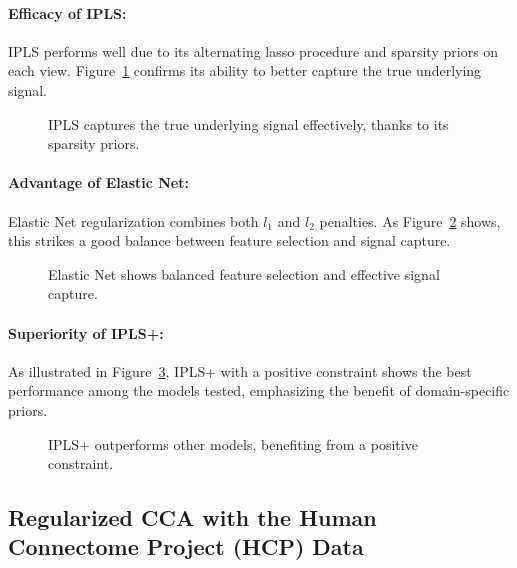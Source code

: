 \paragraph{Efficacy of IPLS:}
IPLS performs well due to its alternating lasso procedure and sparsity priors on each view. Figure~\ref{fig:IPLS_weights} confirms its ability to better capture the true underlying signal.

\begin{figure}[h]
    \centering
    
    \caption{IPLS captures the true underlying signal effectively, thanks to its sparsity priors.}
    \label{fig:IPLS_weights}
\end{figure}

\paragraph{Advantage of Elastic Net:}
Elastic Net regularization combines both $l_1$ and $l_2$ penalties. As Figure~\ref{fig:ElasticNet_weights} shows, this strikes a good balance between feature selection and signal capture.

\begin{figure}[h]
    \centering
    
    \caption{Elastic Net shows balanced feature selection and effective signal capture.}
    \label{fig:ElasticNet_weights}
\end{figure}

\paragraph{Superiority of IPLS+:}
As illustrated in Figure~\ref{fig:IPLS+_weights}, IPLS+ with a positive constraint shows the best performance among the models tested, emphasizing the benefit of domain-specific priors.

\begin{figure}[h]
    \centering
    
    \caption{IPLS+ outperforms other models, benefiting from a positive constraint.}
    \label{fig:IPLS+_weights}
\end{figure}


\subsection{Regularized CCA with the Human Connectome Project (HCP) Data}

